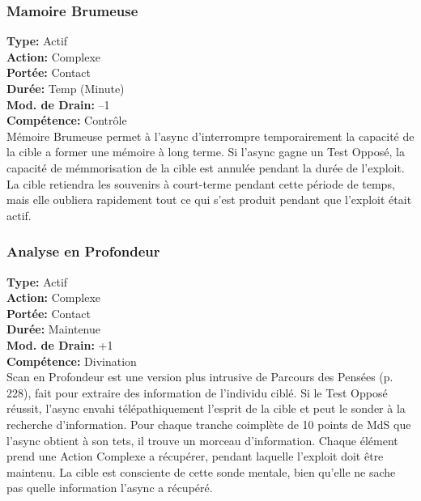 \subsubsection{Mamoire Brumeuse} \textbf{Type:} Actif \\ \textbf{Action:} Complexe \\ \textbf{Portée:} Contact \\ \textbf{Durée:} Temp (Minute) \\ \textbf{Mod. de Drain:} –1 \\ \textbf{Compétence:} Contrôle \\ Mémoire Brumeuse permet à l'async d'interrompre temporairement la capacité de la cible a former une mémoire à long terme. Si l'async gagne un Test Opposé, la capacité de mémmorisation de la cible est annulée pendant la durée de l'exploit. La cible retiendra les souvenirs à court-terme pendant cette période de temps, mais elle oubliera rapidement tout ce qui s'est produit pendant que l'exploit était actif. 

\subsubsection{Analyse en Profondeur} \textbf{Type:} Actif \\ \textbf{Action:} Complexe \\ \textbf{Portée:} Contact \\ \textbf{Durée:} Maintenue \\ \textbf{Mod. de Drain:} +1 \\ \textbf{Compétence:} Divination \\ Scan en Profondeur est une version plus intrusive de Parcours des Pensées (p. 228), fait pour extraire des information de l'individu ciblé. Si le Test Opposé réussit, l'async envahi télépathiquement l'esprit de la cible et peut le sonder à la recherche d'information. Pour chaque tranche coimplète de 10 points de MdS que l'async obtient à son tets, il trouve un morceau d'information. Chaque élément prend une Action Complexe a récupérer, pendant laquelle l'exploit doit être maintenu. La cible est consciente de cette sonde mentale, bien qu'elle ne sache pas quelle information l'async a récupéré. 

